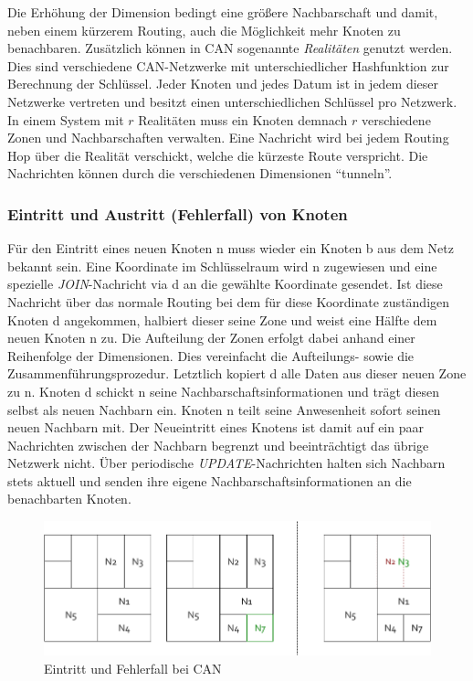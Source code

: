 Die Erhöhung der Dimension bedingt eine größere Nachbarschaft und damit, neben einem kürzerem Routing, auch die Möglichkeit mehr Knoten zu benachbaren. Zusätzlich können in CAN sogenannte \emph{Realitäten} genutzt werden. Dies sind verschiedene CAN-Netzwerke mit unterschiedlicher Hashfunktion zur Berechnung der Schlüssel. Jeder Knoten und jedes Datum ist in jedem dieser Netzwerke vertreten und besitzt einen unterschiedlichen Schlüssel pro Netzwerk. In einem System mit $r$ Realitäten muss ein Knoten demnach $r$ verschiedene Zonen und Nachbarschaften verwalten. Eine Nachricht wird bei jedem Routing Hop über die Realität verschickt, welche die kürzeste Route verspricht. Die Nachrichten können durch die verschiedenen Dimensionen ``tunneln''.

\subsubsection{Eintritt und Austritt (Fehlerfall) von Knoten}
Für den Eintritt eines neuen Knoten n muss wieder ein Knoten b aus dem Netz bekannt sein. Eine Koordinate im Schlüsselraum wird n zugewiesen und eine spezielle \emph{JOIN}-Nachricht via d an die gewählte Koordinate gesendet. Ist diese Nachricht über das normale Routing bei dem für diese Koordinate zuständigen Knoten d angekommen, halbiert dieser seine Zone und weist eine Hälfte dem neuen Knoten n zu. Die Aufteilung der Zonen erfolgt dabei anhand einer Reihenfolge der Dimensionen. Dies vereinfacht die Aufteilungs- sowie die Zusammenführungsprozedur. Letztlich kopiert d alle Daten aus dieser neuen Zone zu n. Knoten d schickt n seine Nachbarschaftsinformationen und trägt diesen selbst als neuen Nachbarn ein. Knoten n teilt seine Anwesenheit sofort seinen neuen Nachbarn mit. Der Neueintritt eines Knotens ist damit auf ein paar Nachrichten zwischen der Nachbarn begrenzt und beeinträchtigt das übrige Netzwerk nicht. Über periodische \emph{UPDATE}-Nachrichten halten sich Nachbarn stets aktuell und senden ihre eigene Nachbarschaftsinformationen an die benachbarten Knoten.

\begin{figure}[htbp]
\centering
\includegraphics{grafics/can_new_node.pdf}
\caption{Eintritt und Fehlerfall bei CAN}
\label{fig:can_new_node}
\end{figure}


